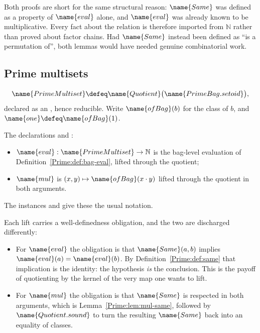 \begin{remark}\label{Prime:rem:cheap-congruence}
Both proofs are short for the same structural reason: $\name{Same}$ was
defined as a property of $\name{eval}$ alone, and $\name{eval}$ was already
known to be multiplicative.  Every fact about the relation is therefore
imported from $\mathbb{N}$ rather than proved about factor chains.  Had
$\name{Same}$ instead been defined as ``is a permutation of'', both lemmas
would have needed genuine combinatorial work.
\end{remark}

\subsection{Prime multisets}

\begin{definition}\label{Prime:def:primemultiset}
\[
  \name{PrimeMultiset} \defeq
    \name{Quotient}\bigl(\name{PrimeBag.setoid}\bigr),
\]
declared as an , hence reducible.  Write
$\name{ofBag}(b)$ for the class of $b$, and $\name{one} \defeq
\name{ofBag}(1)$.
\end{definition}

\begin{definition}\label{Prime:def:quot-ops}
The declarations  and :
\begin{itemize}[leftmargin=1.5em]
  \item $\name{eval} : \name{PrimeMultiset} \to \mathbb{N}$ is the
    bag-level evaluation of Definition~\ref{Prime:def:bag-eval}, lifted
    through the quotient;
  \item $\name{mul}$ is $(x, y) \mapsto \name{ofBag}(x \cdot y)$ lifted
    through the quotient in both arguments.
\end{itemize}
The instances  and  give
these the usual notation.
\end{definition}

Each lift carries a well-definedness obligation, and the two are discharged
differently:

\begin{itemize}[leftmargin=1.5em]
  \item For $\name{eval}$ the obligation is that
    $\name{Same}(a, b)$ implies $\name{eval}(a) = \name{eval}(b)$.  By
    Definition~\ref{Prime:def:same} that implication is the identity: the
    hypothesis \emph{is} the conclusion.  This is the payoff of quotienting
    by the kernel of the very map one wants to lift.
  \item For $\name{mul}$ the obligation is that $\name{Same}$ is respected in
    both arguments, which is Lemma~\ref{Prime:lem:mul-same}, followed by
    $\name{Quotient.sound}$ to turn the resulting $\name{Same}$ back into an
    equality of classes.
\end{itemize}

